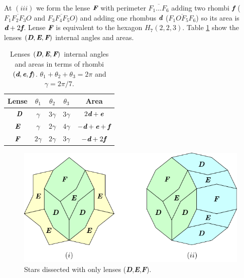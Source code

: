 \documentclass[11pt]{article}
\def\mathbi#1{\textbf{\em #1}}
\begin{document}
At $(iii)$ we form the lense $\mathbi{F}$ with perimeter $\overline{F_1...F_6}$ adding two rhombi $\mathbi{f}$ ($\overline{F_1F_2F_3O}$ and $\overline{F_3F_4F_5O}$) and adding one rhombus $\mathbi{d}$ ($\overline{F_1OF_5F_6}$) so its area is $\mathbi{d} + 2\mathbi{f}$. Lense $\mathbi{F}$ is equivalent to the hexagon $H_7(2,2,3)$.
Table \ref{tbl:def-lenses-angles} show the lenses $(\mathbi{D},\mathbi{E},\mathbi{F})$ internal angles and areas.

\begin{table}[H]
\begin{center}
\begin{tabular}{|c|c c c| c |} \hline
Lense & $\theta_1$ & $\theta_2$ & $\theta_3$ & Area \\ \hline\
$\mathbi{D}$ & $\gamma$  & $3\gamma$ & $3\gamma$ & $2\mathbi{d} + \mathbi{e}$
\\[0.5ex] \hline
$\mathbi{E}$ & $\gamma$  & $2\gamma$ & $4\gamma$ & $-\mathbi{d} + \mathbi{e} + \mathbi{f}$
\\[0.5ex] \hline
$\mathbi{F}$ & $2\gamma$ & $2\gamma$ & $3\gamma$ & $-\mathbi{d} + 2\mathbi{f}$ 
\\[0.5ex] \hline
\end{tabular}
\caption{Lenses $(\mathbi{D},\mathbi{E},\mathbi{F})$ internal angles and areas in terms of rhombi $(\mathbi{d},\mathbi{e},\mathbi{f})$. $\theta_1+\theta_2+\theta_3 = 2\pi$ and $\gamma = 2\pi/7$.} 
\label{tbl:def-lenses-angles}
\end{center}
\end{table}



\begin{figure}[H]
\centering
\includegraphics[scale=1.1]{def/def-stars-2}
\caption{Stars dissected with only lenses (\mathbi{D},\mathbi{E},\mathbi{F}).}
\label{fig:def-stars-2}
\end{figure}
\end{document}
